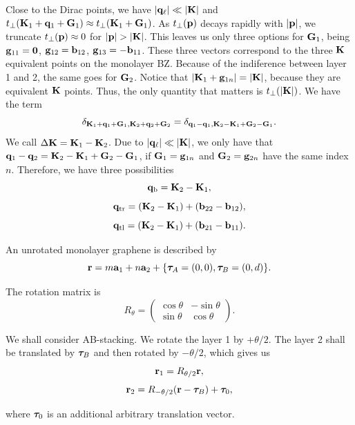 \documentclass[a4paper,10pt]{article}
\begin{document}
Close to the Dirac points, we have $\abs{{\vb{q}}_\ell} \ll \abs{{\vb{K}}}$ and $t_\perp({\vb{K}}_1+{\vb{q}}_1+{\vb{G}}_1) \approx t_\perp({\vb{K}}_1+{\vb{G}}_1)$. As $t_\perp({\vb{p}})$ decays rapidly with $\abs{{\vb{p}}}$, we truncate $t_\perp({\vb{p}}) \approx 0$ for $\abs{{\vb{p}}} > \abs{{\vb{K}}}$. This leaves us only three options for ${\vb{G}}_1$, being ${\vb{g}}_{11} = {\vb{0}}$, ${\vb{g}}_{12} = {\vb{b}}_{12}$, ${\vb{g}}_{13} = -{\vb{b}}_{11}$. These three vectors correspond to the three ${\vb{K}}$ equivalent points on the monolayer BZ. Because of the indiference between layer 1 and 2, the same goes for ${\vb{G}}_2$. Notice that $\abs{{\vb{K}}_1+{\vb{g}}_{1n}} = \abs{{\vb{K}}}$, because they are equivalent ${\vb{K}}$ points. Thus, the only quantity that matters is $t_\perp(\abs{{\vb{K}}})$. We have the term
$$
\delta_{{\vb{K}}_1+{\vb{q}}_1+{\vb{G}}_1,{\vb{K}}_2+{\vb{q}}_2+{\vb{G}}_2} = \delta_{{\vb{q}}_1-{\vb{q}}_1,{\vb{K}}_2-{\vb{K}}_1+{\vb{G}}_2-{\vb{G}}_1}.
$$
We call $\Delta{\vb{K}} = {\vb{K}}_1-{\vb{K}}_2$. Due to $\abs{{\vb{q}}_\ell} \ll \abs{{\vb{K}}}$, we only have that ${\vb{q}}_1-{\vb{q}}_2 = {\vb{K}}_2-{\vb{K}}_1+{\vb{G}}_2-{\vb{G}}_1$, if ${\vb{G}}_1 = {\vb{g}}_{1n}$ and ${\vb{G}}_2 = {\vb{g}}_{2n}$ have the same index $n$. Therefore, we have three possibilities
$$
{\vb{q}}_\text{b} = {\vb{K}}_2 - {\vb{K}}_1,
$$
$$
{\vb{q}}_\text{tr} = ({\vb{K}}_2 - {\vb{K}}_1) + ({\vb{b}}_{22} - {\vb{b}}_{12}),
$$
$$
{\vb{q}}_\text{tl} = ({\vb{K}}_2 - {\vb{K}}_1) + ({\vb{b}}_{21} - {\vb{b}}_{11}).
$$

\n

An unrotated monolayer graphene is described by
$$
{\vb{r}} = m {\vb{a}}_1 + n {\vb{a}}_2 + \{ {\bm{\tau}}_A = (0,0), {\bm{\tau}}_B = (0,d) \}.
$$

The rotation matrix is
$$
R_\theta =
\begin{pmatrix}
\cos\theta & -\sin\theta \\
\sin\theta & \cos\theta
\end{pmatrix}.
$$

We shall consider AB-stacking. We rotate the layer 1 by $+\theta/2$. The layer 2 shall be translated by ${\bm{\tau}}_B$ and then rotated by $-\theta/2$, which gives us
$$
{\vb{r}}_1 = R_{\theta/2} {\vb{r}},
$$
$$
{\vb{r}}_2 = R_{-\theta/2} ({\vb{r}} - {\bm{\tau}}_B) + {\bm{\tau}}_0,
$$

where ${\bm{\tau}}_0$ is an additional arbitrary translation vector.






%


\end{document}
